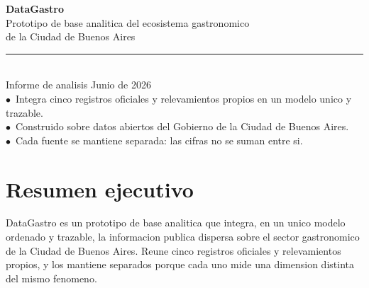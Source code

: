 \documentclass[11pt,a4paper]{article}
\begin{document}
\begin{titlepage}
\thispagestyle{empty}
\colorbox{ink}{\parbox[t][\paperheight][t]{\paperwidth}{%
\vspace*{4cm}\hspace*{2cm}%
\begin{minipage}{0.82\paperwidth}
{\color{white}\fontsize{42}{48}\selectfont\bfseries DataGastro}\\[10pt]
{\color{white!85}\Large Prototipo de base analitica del ecosistema gastronomico}\\[2pt]
{\color{white!85}\Large de la Ciudad de Buenos Aires}\\[14pt]
{\color{accent}\rule{7cm}{2pt}}\\[10pt]
{\color{white!70}\large Informe de analisis \textperiodcentered{} Junio de 2026}\\[3cm]
{\color{white!60}\small $\bullet$~Integra cinco registros oficiales y relevamientos propios en un modelo unico y trazable.}\\[4pt]
{\color{white!60}\small $\bullet$~Construido sobre datos abiertos del Gobierno de la Ciudad de Buenos Aires.}\\[4pt]
{\color{white!60}\small $\bullet$~Cada fuente se mantiene separada: las cifras no se suman entre si.}
\end{minipage}}}
\end{titlepage}

\section*{Resumen ejecutivo}
DataGastro es un prototipo de base analitica que integra, en un unico modelo ordenado y trazable, la informacion publica dispersa sobre el sector gastronomico de la Ciudad de Buenos Aires. Reune cinco registros oficiales y relevamientos propios, y los mantiene separados porque cada uno mide una dimension distinta del mismo fenomeno.
\end{document}
